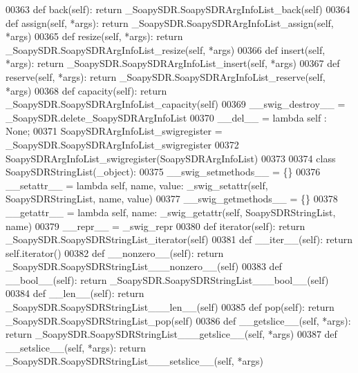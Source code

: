 \begin{DoxyCode}
{{{{00363     \textcolor{keyword}{def }back(self): \textcolor{keywordflow}{return} \_SoapySDR.SoapySDRArgInfoList\_back(self)
00364     \textcolor{keyword}{def }assign(self, *args): \textcolor{keywordflow}{return} \_SoapySDR.SoapySDRArgInfoList\_assign(self, *args)
00365     \textcolor{keyword}{def }resize(self, *args): \textcolor{keywordflow}{return} \_SoapySDR.SoapySDRArgInfoList\_resize(self, *args)
00366     \textcolor{keyword}{def }insert(self, *args): \textcolor{keywordflow}{return} \_SoapySDR.SoapySDRArgInfoList\_insert(self, *args)
00367     \textcolor{keyword}{def }reserve(self, *args): \textcolor{keywordflow}{return} \_SoapySDR.SoapySDRArgInfoList\_reserve(self, *args)
00368     \textcolor{keyword}{def }capacity(self): \textcolor{keywordflow}{return} \_SoapySDR.SoapySDRArgInfoList\_capacity(self)
00369     \_\_swig\_destroy\_\_ = \_SoapySDR.delete\_SoapySDRArgInfoList
00370     \_\_del\_\_ = \textcolor{keyword}{lambda} self : \textcolor{keywordtype}{None};
00371 SoapySDRArgInfoList\_swigregister = \_SoapySDR.SoapySDRArgInfoList\_swigregister
00372 SoapySDRArgInfoList_swigregister(SoapySDRArgInfoList)
00373 
00374 \textcolor{keyword}{class }SoapySDRStringList(_object):
00375     \_\_swig\_setmethods\_\_ = \{\}
00376     \_\_setattr\_\_ = \textcolor{keyword}{lambda} self, name, value: _swig_setattr(self, SoapySDRStringList, name, value)
00377     \_\_swig\_getmethods\_\_ = \{\}
00378     \_\_getattr\_\_ = \textcolor{keyword}{lambda} self, name: _swig_getattr(self, SoapySDRStringList, name)
00379     \_\_repr\_\_ = \_swig\_repr
00380     \textcolor{keyword}{def }iterator(self): \textcolor{keywordflow}{return} \_SoapySDR.SoapySDRStringList\_iterator(self)
00381     \textcolor{keyword}{def }__iter__(self): \textcolor{keywordflow}{return} self.iterator()
00382     \textcolor{keyword}{def }__nonzero__(self): \textcolor{keywordflow}{return} \_SoapySDR.SoapySDRStringList\_\_\_nonzero\_\_(self)
00383     \textcolor{keyword}{def }__bool__(self): \textcolor{keywordflow}{return} \_SoapySDR.SoapySDRStringList\_\_\_bool\_\_(self)
00384     \textcolor{keyword}{def }__len__(self): \textcolor{keywordflow}{return} \_SoapySDR.SoapySDRStringList\_\_\_len\_\_(self)
00385     \textcolor{keyword}{def }pop(self): \textcolor{keywordflow}{return} \_SoapySDR.SoapySDRStringList\_pop(self)
00386     \textcolor{keyword}{def }__getslice__(self, *args): \textcolor{keywordflow}{return} \_SoapySDR.SoapySDRStringList\_\_\_getslice\_\_(self, *args)
00387     \textcolor{keyword}{def }__setslice__(self, *args): \textcolor{keywordflow}{return} \_SoapySDR.SoapySDRStringList\_\_\_setslice\_\_(self, *args)
}}}}
\end{DoxyCode}
